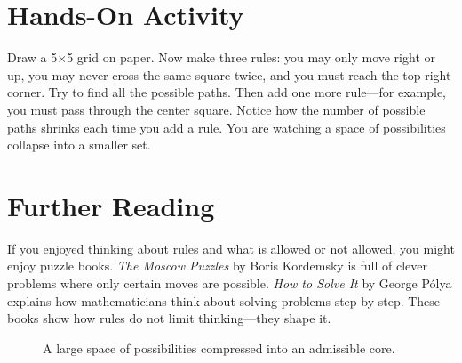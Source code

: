 \documentclass[11pt]{book}
\theoremstyle{definition}
\theoremstyle{remark}
\begin{document}
\section*{Hands-On Activity}

Draw a 5$\times$5 grid on paper. Now make three rules: you may only move
right or up, you may never cross the same square twice, and you must
reach the top-right corner. Try to find all the possible paths. Then
add one more rule---for example, you must pass through the center
square. Notice how the number of possible paths shrinks each time you
add a rule. You are watching a space of possibilities collapse into a
smaller set.

\section*{Further Reading}

If you enjoyed thinking about rules and what is allowed or not allowed,
you might enjoy puzzle books. \textit{The Moscow Puzzles} by Boris
Kordemsky is full of clever problems where only certain moves are
possible. \textit{How to Solve It} by George P\'{o}lya explains how
mathematicians think about solving problems step by step. These books
show how rules do not limit thinking---they shape it.

\begin{figure}[h]
\centering
{}
\caption{A large space of possibilities compressed into an admissible core.}
\end{figure}
\end{document}
